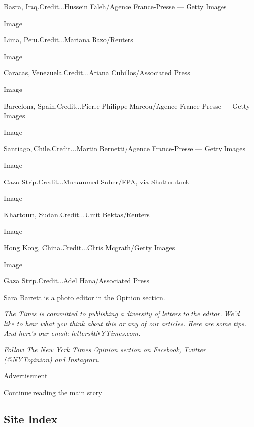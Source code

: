 Basra, Iraq.Credit...Hussein Faleh/Agence France-Presse --- Getty Images

Image

Lima, Peru.Credit...Mariana Bazo/Reuters

Image

Caracas, Venezuela.Credit...Ariana Cubillos/Associated Press

Image

Barcelona, Spain.Credit...Pierre-Philippe Marcou/Agence France-Presse
--- Getty Images

Image

Santiago, Chile.Credit...Martin Bernetti/Agence France-Presse --- Getty
Images

Image

Gaza Strip.Credit...Mohammed Saber/EPA, via Shutterstock

Image

Khartoum, Sudan.Credit...Umit Bektas/Reuters

Image

Hong Kong, China.Credit...Chris Mcgrath/Getty Images

Image

Gaza Strip.Credit...Adel Hana/Associated Press

Sara Barrett is a photo editor in the Opinion section.

\emph{The Times is committed to publishing}
\href{https://www.nytimes3xbfgragh.onion/2019/01/31/opinion/letters/letters-to-editor-new-york-times-women.html}{\emph{a
diversity of letters}} \emph{to the editor. We'd like to hear what you
think about this or any of our articles. Here are some}
\href{https://help.nytimes3xbfgragh.onion/hc/en-us/articles/115014925288-How-to-submit-a-letter-to-the-editor}{\emph{tips}}\emph{.
And here's our email:}
\href{mailto:letters@NYTimes.com}{\emph{letters@NYTimes.com}}\emph{.}

\emph{Follow The New York Times Opinion section on}
\href{https://www.facebookcorewwwi.onion/nytopinion}{\emph{Facebook}}\emph{,}
\href{http://twitter.com/NYTOpinion}{\emph{Twitter (@NYTopinion)}}
\emph{and}
\href{https://www.instagram.com/nytopinion/}{\emph{Instagram}}\emph{.}

Advertisement

\protect\hyperlink{after-bottom}{Continue reading the main story}

\hypertarget{site-index}{%
\subsection{Site Index}\label{site-index}}

